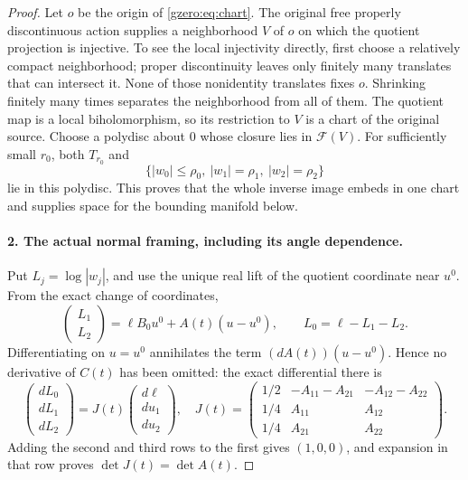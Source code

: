 \documentclass[11pt]{article}
\theoremstyle{definition}
\begin{document}
\begin{proof}
Let \(o\) be the origin of \eqref{gzero:eq:chart}. The original free properly
discontinuous action supplies a neighborhood \(V\) of \(o\) on which
the quotient projection is injective. To see the local injectivity
directly, first choose a relatively compact neighborhood; proper
discontinuity leaves only finitely many translates that can intersect it.
None of those nonidentity translates fixes \(o\). Shrinking finitely
many times separates the neighborhood from all of them. The quotient
map is a local biholomorphism, so its restriction to \(V\) is a chart
of the original source.
Choose a polydisc about \(0\) whose closure lies in \(\mathcal F(V)\).
For sufficiently small \(r_0\), both \(T_{r_0}\) and
\begin{equation}
 \{|w_0|\leq\rho_0,\ |w_1|=\rho_1,\ |w_2|=\rho_2\}
 \label{gzero:eq:spatial-bound}
\end{equation}
lie in this polydisc. This proves that the whole inverse image embeds
in one chart and supplies space for the bounding manifold below.

\paragraph{2. The actual normal framing, including its angle dependence.}
Put \(L_j=\log|w_j|\), and use the unique real lift of the quotient
coordinate near \(u^0\). From the exact change of coordinates,
\begin{equation}
 \begin{pmatrix}L_1\\L_2\end{pmatrix}
 =\ell B_0u^0+A(t)(u-u^0),\qquad
 L_0=\ell-L_1-L_2.
 \label{gzero:eq:nearby-moduli}
\end{equation}
Differentiating on \(u=u^0\) annihilates the term
\((dA(t))(u-u^0)\). Hence no derivative of \(C(t)\) has been omitted:
the exact differential there is
\begin{equation}
 \begin{pmatrix}dL_0\\dL_1\\dL_2\end{pmatrix}
 =J(t)\begin{pmatrix}d\ell\\du_1\\du_2\end{pmatrix},\quad
 J(t)=
 \begin{pmatrix}
 1/2&-A_{11}-A_{21}&-A_{12}-A_{22}\\
 1/4&A_{11}&A_{12}\\
 1/4&A_{21}&A_{22}
 \end{pmatrix}.
 \label{gzero:eq:J}
\end{equation}
Adding the second and third rows to the first gives \((1,0,0)\),
and expansion in that row proves \(\det J(t)=\det A(t)\).


\end{proof}
\end{document}

